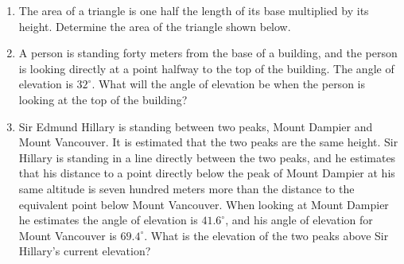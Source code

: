 \begin{enumerate}
\item The area of a triangle is one half the length of its
  base multiplied by its height. Determine the area of the triangle
  shown below. \\ 

\item A person is standing forty meters from the base of a building,
  and the person is looking directly at a point halfway to the top of
  the building. The angle of elevation is $32^\circ$.  What will the
  angle of elevation be when the person is looking at the top of the
  building?

\item Sir Edmund Hillary is standing between two peaks, Mount Dampier
  and Mount Vancouver.  It is estimated that the two peaks are the
  same height. Sir Hillary is standing in a line directly between the
  two peaks, and he estimates that his distance to a point directly
  below the peak of Mount Dampier at his same altitude is seven
  hundred meters more than the distance to the equivalent point below
  Mount Vancouver. When looking at Mount Dampier he estimates the
  angle of elevation is $41.6^\circ$, and his angle of elevation for
  Mount Vancouver is $69.4^\circ$. What is the elevation of the two
  peaks above Sir Hillary's current elevation?

\end{enumerate}



  

